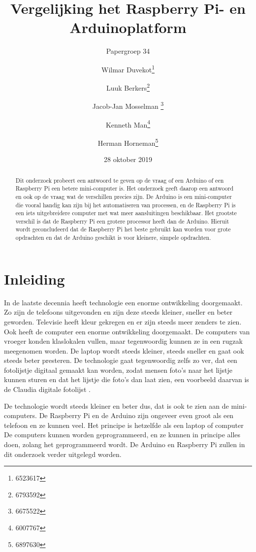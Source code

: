 \documentclass[a4paper, dutch, abstract=true]{scrartcl}
\title{Vergelijking het Raspberry Pi- en Arduinoplatform}
\subtitle{Papergroep 34}
\author{
    Wilmar Duvekot\thanks{6523617} \and Luuk Berkers\thanks{6793592} \and Jacob-Jan Mosselman
    \thanks{6675522} \and Kenneth Man\thanks{6007767} \and Herman Horneman\thanks{6897630}
}
\date{28 oktober 2019}
\begin{document}
\maketitle

\begin{abstract}
    Dit onderzoek probeert een antwoord te geven op de vraag of een Arduino of een Raspberry Pi een
    betere mini-computer is.
    Het onderzoek geeft daarop een antwoord en ook op de vraag wat de verschillen precies zijn.
    De Arduino is een mini-computer die vooral handig kan zijn bij het automatiseren van processen,
    en de Raspberry Pi is een iets uitgebreidere computer met wat meer aansluitingen beschikbaar.
    Het grootste verschil is dat de Raspberry Pi een grotere processor heeft dan de Arduino.
    Hieruit wordt geconcludeerd dat de Raspberry Pi het beste gebruikt kan worden voor grote
    opdrachten en dat de Arduino geschikt is voor kleinere, simpele opdrachten.
\end{abstract}

\tableofcontents

\section{Inleiding}
In de laatste decennia heeft technologie een enorme ontwikkeling doorgemaakt.
Zo zijn de telefoons uitgevonden en zijn deze steeds kleiner, sneller en beter geworden.
Televisie heeft kleur gekregen en er zijn steeds meer zenders te zien.
Ook heeft de computer een enorme ontwikkeling doorgemaakt.
De computers van vroeger konden klaslokalen vullen, maar tegenwoordig kunnen ze in een rugzak
meegenomen worden.
De laptop wordt steeds kleiner, steeds sneller en gaat ook steeds beter presteren.
De technologie gaat tegenwoordig zelfs zo ver, dat een fotolijstje digitaal gemaakt kan worden,
zodat mensen foto's naar het lijstje kunnen sturen en dat het lijstje die foto's dan laat zien, een
voorbeeld daarvan is de Claudia digitale fotolijst \cite{innovu2019fotolijst}.

De technologie wordt steeds kleiner en beter dus, dat is ook te zien aan de mini-computers.
De Raspberry Pi \cite{raspberry2019raspberry} en de Arduino \cite{arduino2019arduino} zijn ongeveer
even groot als een telefoon en ze kunnen veel.
Het principe is hetzelfde als een laptop of computer
De computers kunnen worden geprogrammeerd, en ze kunnen in principe alles doen, zolang het
geprogrammeerd wordt.
De Arduino en Raspberry Pi zullen in dit onderzoek verder uitgelegd worden.
\end{document}

